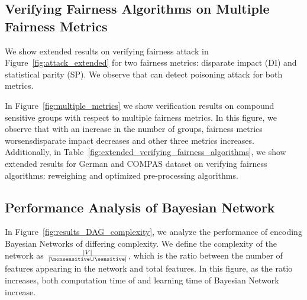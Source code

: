 	\subsection{Verifying Fairness Algorithms on Multiple Fairness Metrics}
	
	We show extended results on verifying fairness attack in Figure~\ref{fig:attack_extended} for two fairness metrics: disparate impact (DI) and statistical parity (SP). We observe that {\framework} can detect poisoning attack for both metrics. 
	
	In Figure~\ref{fig:multiple_metrics} we show verification results on compound sensitive groups with respect to multiple fairness metrics. In this figure, we observe that with an increase in the number of groups, fairness metrics worsens\textemdash disparate impact decreases and other three metrics increases. Additionally, in Table~\ref{fig:extended_verifying_fairness_algorithms}, we show extended results for German and COMPAS dataset on verifying fairness algorithms: reweighing and optimized pre-processing algorithms. 
		
	\subsection{Performance Analysis of Bayesian Network}
	In Figure~\ref{fig:results_DAG_complexity}, we analyze the performance of encoding Bayesian Networks of differing complexity. We define the complexity of the network as  $ \frac{|V|}{|\nonsensitive \cup \sensitive|} $, which is the ratio between the number of features appearing in the network and total features. In this figure, as the ratio increases, both computation time of {\framework} and learning time of Bayesian Network increase. 
	
	
	
